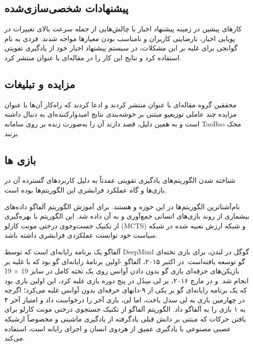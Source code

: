 \documentclass[12pt]{report}
\begin{document}
\subsection{پیشنهادات شخصی‌سازی‌شده}

کارهای پیشین در زمینه پیشنهاد اخبار با چالش‌هایی از جمله سرعت بالای تغییرات در پویایی اخبار، نارضایتی کاربران و نامناسب بودن معیارها مواجه شدند. فردی به نام گوانجی برای غلبه بر این مشکلات، در سیستم پیشنهاد اخبار خود از یادگیری تقویتی استفاده کرد و نتایج این کار را در مقاله‌ای با عنوان   منتشر کرد.

\subsection{مزایده و تبلیغات}

محققین گروه  مقاله‌ای با عنوان   منتشر کردند و ادعا کردند که راه‌کار آن‌ها با عنوان
مزایده چند عاملی توزیعیو مبتنی بر خوشه‌بندی  نتایج امیدوارکننده‌ای به دنبال داشته است و به همین دلیل، قصد دارند آن را به‌صورت زنده بر روی سامانه TaoBao محک بزنند.

\subsection{بازی ها}
شناخته شدن الگوریتم‌های یادگیری تقویتی عمدتاً به دلیل کاربردهای گسترده آن در بازی‌ها و گاه عملکرد فرابشری این الگوریتم‌ها بوده است.

نام‌آشناترین الگوریتم‌ها در این حوزه  و  هستند. برای آموزش الگوریتم آلفاگو داده‌های بیشماری از روند بازی‌های انسانی جمع‌آوری و به آن داده شد. این الگوریتم با بهره‌گیری از تکنیک جست‌وجوی درختی مونت کارلو (MCTS) و شبکه ارزش تعبیه شده در شبکه سیاست خود توانست عملکردی فرابشری داشته باشد.

آلفاگو  یک برنامه رایانه‌ای است که توسط DeepMind گوگل در لندن، برای بازی تخته‌ای گو  توسعه یافته‌است. در اکتبر ۲۰۱۵، آلفاگو -اولین برنامهٔ رایانه‌ای گو بود که با غلبه بر بازیکن‌های حرفه‌ای بازی گو بدون دادن آوانس روی یک تخته کامل در سایز 19 × 19 انجام شد. و در مارچ ۲۰۱۶، بر لی سِدُل در پنج دوره بازی غلبه کرد، این اولین باری بود که یک برنامه رایانه‌ای گو بر یکی از ۹-دانهای حرفه‌ای بدون آوانس غلبه می‌کرد؛ اگرچه در چهارمین بازی به لی سدل باخت، اما لی، بازی آخر را درخواست داد و امتیاز آخر ۴ به ۱ بازی را به آلفاگو داد. الگوریتم آلفاگو از تکنیک جستجوی درختی مونت کارلو برای یافتن حرکات که مبتنی بر دانش قبلی یادگرفته از یادگیری ماشینی و مخصوصاً ازشبکه عصبی مصنوعی با یادگیری عمیق از هردوی انسان و اجرای رایانه است، استفاده می‌کند.
\end{document}
